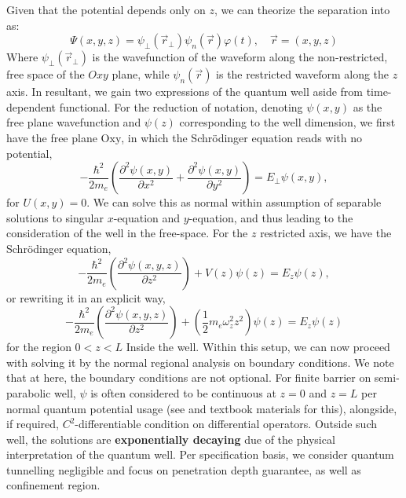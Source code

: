 \documentclass[%
 reprint,
 amsmath,amssymb,
 aps,
]{revtex4-2}
\begin{document}
Given that the potential depends only on $z$, we can theorize the separation into as: 
\begin{equation}
  \Psi(x,y,z)=\psi_{\perp}(\vec{r}_{\perp})\psi_{n}(\vec{r})\varphi(t), \quad \vec{r} = (x,y,z)
\end{equation}
Where $\psi_{\perp}(\vec{r}_{\perp})$ is the wavefunction of the waveform along the non-restricted, free space of the $Oxy$ plane, while $\psi_{n}(\vec{r})$ is the restricted waveform along the $z$ axis. In resultant, we gain two expressions of the quantum well aside from time-dependent functional. For the reduction of notation, denoting $\psi(x,y)$ as the free plane wavefunction and $\psi(z)$ corresponding to the well dimension, we first have the free plane $\mathrm{Oxy}$, in which the Schrödinger equation reads with no potential,
\begin{equation}
  -\frac{\hbar^{2}}{2m_e} \left(\frac{\partial^{2}\psi(x,y)}{\partial x^{2}}+\frac{\partial^{2}\psi(x,y)}{\partial y^{2}}\right)  = E_{\perp}\psi(x,y),
\end{equation}
for $U(x,y)=0$. We can solve this as normal within assumption of separable solutions to singular $x$-equation and $y$-equation, and thus leading to the consideration of the well in the free-space. For the $z$ restricted axis, we have the Schrödinger equation,
\begin{equation*}
  -\frac{\hbar^{2}}{2m_e}\left(\frac{\partial^{2}\psi(x,y,z)}{\partial z^{2}}\right)+V(z)\psi(z)=E_{z}\psi(z),
\end{equation*}
or rewriting it in an explicit way,
\begin{equation}
  -\frac{\hbar^{2}}{2m_e}\left(\frac{\partial^{2}\psi(x,y,z)}{\partial z^{2}}\right)+\left( \frac{1}{2}m_{e}\omega_{z}^{2}z^{2} \right)\psi(z)=E_{z}\psi(z)
\end{equation}
for the region $0 < z < L$ Inside the well. Within this setup, we can now proceed with solving it by the normal regional analysis on boundary conditions. We note that at here, the boundary conditions are not optional. For finite barrier on semi-parabolic well, $\psi$ is often considered to be continuous at $z=0$ and $z=L$ per normal quantum potential usage (see \cite{griffiths2018,sakurai2017} and textbook materials \cite{davies1998} for this), alongside, if required, $C^{2}$-differentiable condition on differential operators. Outside such well, the solutions are \textbf{exponentially decaying} due of the physical interpretation of the quantum well. Per specification basis, we consider quantum tunnelling negligible and focus on penetration depth guarantee, as well as confinement region. 
\end{document}

